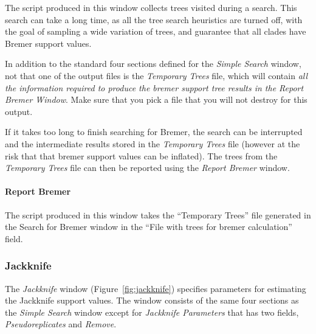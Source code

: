 The script produced in this window collects trees visited during a search. This
search can take a long time, as all the tree search heuristics are turned off,
with the goal of sampling a wide variation of trees, and guarantee that all
clades have Bremer support values. 

In addition to the standard four sections defined for the \emph{Simple Search} window,
not that one of the output files is the \emph{Temporary Trees} file, which will
contain \emph{all the information required to produce the bremer support tree
results in the Report Bremer Window}. Make sure that you pick a file that you
will not destroy for this output.

If it takes \poy too long to finish searching for Bremer, the search can be interrupted and the intermediate results stored in the \emph{Temporary Trees} file (however at the risk that that bremer support values can be inflated). The trees from the \emph{Temporary Trees} file can then be reported using the \emph{Report Bremer} window.

\paragraph{Report Bremer}
The script produced in this window takes the ``Temporary Trees'' file generated in the Search for Bremer window in the ``File with trees for
bremer calculation'' field. 

\subsubsection{Jackknife}

The \emph{Jackknife} window (Figure~\ref{fig:jackknife}) specifies parameters for estimating the
Jackknife support values. The window consists of the same
four sections as the \emph{Simple Search} window except for
\emph{Jackknife Parameters} that has two fields, \emph{Pseudoreplicates}
and \emph{Remove}.

